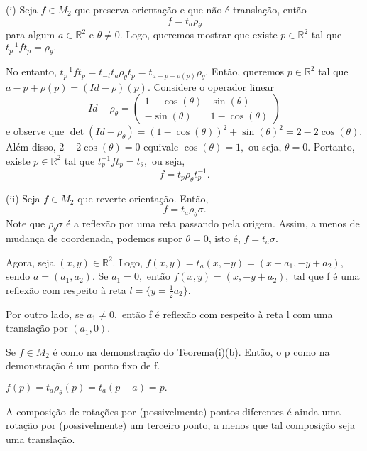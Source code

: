 \documentclass[Algebra/algebra_notes.tex]{subfiles}
\begin{document}
\begin{proof*}
	(i) Seja $f\in M_{2}$ que preserva orientação e que não é translação, então
	$$
		f = t_{a}\rho_{\theta }
	$$
	para algum $a\in \mathbb{R}^{2}$ e $\theta \neq0.$ Logo, queremos mostrar que existe $p\in \mathbb{R}^{2}$
	tal que $t_{p}^{-1}ft_{p}=\rho_{\theta }.$

	No entanto, $t_{p}^{-1}ft_{p}=t_{-t}t_{a}\rho _{\theta }t_{p} = t_{a-p+\rho (p)}\rho _{\theta }.$
	Então, queremos $p\in \mathbb{R}^{2}$ tal que $a - p + \rho (p) = (Id - \rho )(p).$ Considere o operador linear
	$$
		Id - \rho _{\theta } = \begin{pmatrix}
			1 - \cos{(\theta )} & \sin{(\theta )}   \\
			-\sin{(\theta )}    & 1-\cos{(\theta )}
		\end{pmatrix}
	$$
	e observe que $\det{(Id-\rho _{\theta })} = (1-\cos{(\theta )})^{2} +\sin{(\theta )}^{2} = 2-2\cos{(\theta )}.$
	Além disso, $2-2\cos{(\theta )} = 0$ equivale $\cos{(\theta )}=1,$ ou seja, $\theta =0.$ Portanto, existe
	$p\in \mathbb{R}^{2}$ tal que $t_{p}^{-1}ft_{p}=t_{\theta },$ ou seja,
	$$
		f = t_{p}\rho _{\theta }t_{p}^{-1}.
	$$

	(ii) Seja $f\in M_{2}$ que reverte orientação. Então,
	$$
		f = t_a\rho _{\theta }\sigma.
	$$
	Note que $\rho _{\theta }\sigma $ é a reflexão por uma reta passando pela origem. Assim, a menos de mudança de coordenada,
	podemos supor $\theta =0$, isto é, $f = t_{a}\sigma .$

	Agora, seja $(x, y)\in \mathbb{R}^{2}.$ Logo, $f(x,y) = t_{a}(x, -y)=(x+a_{1}, -y+a_{2}),$ sendo $a = (a_{1}, a_{2})$.
	Se $a_{1}=0,$ então $f(x, y) = (x, -y+a_{2}),$ tal que f é uma reflexão com respeito à reta $l=\{y=\frac{1}{2}a_{2}\}.$

	Por outro lado, se $a_{1}\neq0,$ então f é reflexão com respeito à reta l com uma translação por $(a_{1}, 0).$ \qedsymbol
\end{proof*}
\begin{crl*}
	Se $f\in M_{2}$ é como na demonstração do Teorema(i)(b). Então, o p como na demonstração é um ponto fixo de f.
\end{crl*}
\begin{proof*}
	$f(p)=t_{a}\rho _{\theta }(p) = t_{a}(p-a) = p.$ \qedsymbol
\end{proof*}
\begin{crl*}
	A composição de rotações por (possivelmente) pontos diferentes é ainda uma rotação por (possivelmente) um terceiro ponto,
	a menos que tal composição seja uma translação.
\end{crl*}
\end{document}
